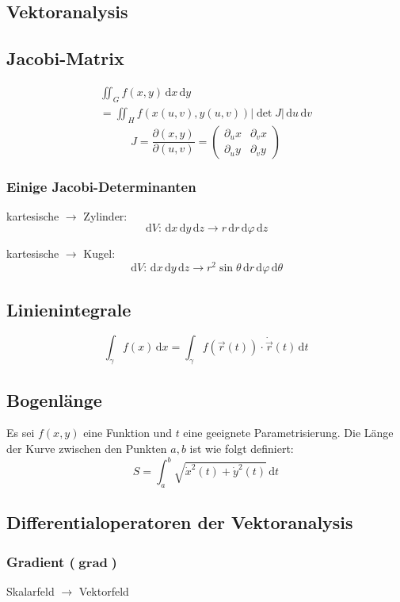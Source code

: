 \documentclass[12pt]{article}
\newcommand{\ud}{\,\mathrm{d}}
\DeclareMathOperator{\grad}{\mathbf{grad}}
\begin{document}
\begin{multicols*}{3}
		\section{Vektoranalysis} %
			\subsection{Jacobi-Matrix} %
				\begin{gather*}
					\iint_G f(x,y) \ud x \ud y \\ = \iint_H f(x(u,v), y(u,v)) |\det J| \ud u \ud v
				\end{gather*}
				\[
					J = \frac{\partial(x,y)}{\partial(u,v)} = \left( \begin{array}{cc}
						\partial_u x & \partial_v x \\
						\partial_u y & \partial_v y
					\end{array} \right)
				\]
				\subsubsection{Einige Jacobi-Determinanten} %
					kartesische $\to$ Zylinder:
					\[
						\ud V: \ud x \ud y \ud z \to r \ud r \ud \varphi \ud z
					\]
					
					kartesische $\to$ Kugel:
					\[
						\ud V: \ud x \ud y \ud z \to r^2 \sin \theta \ud r \ud \varphi \ud \theta
					\]
			\subsection{Linienintegrale} %
				\[
					\int_{\gamma} f(x) \ud x = \int_{\gamma} f(\vec{r}(t)) \cdot \dot{\vec{r}}(t) \ud t
				\]
			\subsection{Bogenlänge} %
				Es sei $f(x,y)$ eine Funktion und $t$ eine geeignete Parametrisierung. Die Länge der Kurve zwischen den Punkten $a, b$ ist wie folgt definiert:
				\[
					S = \int_a^b \sqrt{\dot{x}^2(t) + \dot{y}^2(t)} \ud t
				\]
			\subsection{Differentialoperatoren der Vektoranalysis} %
				\subsubsection{Gradient ($\grad$)} %
					Skalarfeld $\rightarrow$ Vektorfeld
					

\end{multicols*}
\end{document}
